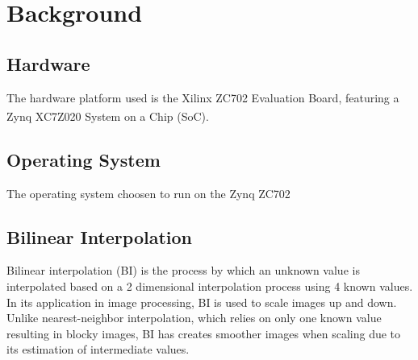
\chapter{Background}

\section{Hardware}
The hardware platform used is the Xilinx ZC702 Evaluation Board, featuring a Zynq\textsuperscript{\textregistered} XC7Z020 System on a Chip (SoC).

\section{Operating System}
The operating system choosen to run on the Zynq ZC702

\section{Bilinear Interpolation}
Bilinear interpolation (BI) is the process by which an unknown value is interpolated based on a 2 dimensional interpolation process using 4 known values.  In its application in image processing, BI is used to scale images up and down.  Unlike nearest-neighbor interpolation, which relies on only one known value resulting in blocky images, BI has creates smoother images when scaling due to its estimation of intermediate values.

